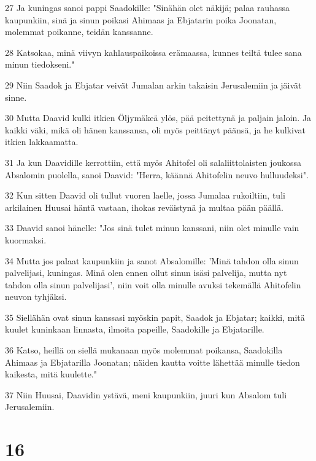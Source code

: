 \par 27 Ja kuningas sanoi pappi Saadokille: "Sinähän olet näkijä; palaa rauhassa kaupunkiin, sinä ja sinun poikasi Ahimaas ja Ebjatarin poika Joonatan, molemmat poikanne, teidän kanssanne.
\par 28 Katsokaa, minä viivyn kahlauspaikoissa erämaassa, kunnes teiltä tulee sana minun tiedokseni."
\par 29 Niin Saadok ja Ebjatar veivät Jumalan arkin takaisin Jerusalemiin ja jäivät sinne.
\par 30 Mutta Daavid kulki itkien Öljymäkeä ylös, pää peitettynä ja paljain jaloin. Ja kaikki väki, mikä oli hänen kanssansa, oli myös peittänyt päänsä, ja he kulkivat itkien lakkaamatta.
\par 31 Ja kun Daavidille kerrottiin, että myös Ahitofel oli salaliittolaisten joukossa Absalomin puolella, sanoi Daavid: "Herra, käännä Ahitofelin neuvo hulluudeksi".
\par 32 Kun sitten Daavid oli tullut vuoren laelle, jossa Jumalaa rukoiltiin, tuli arkilainen Huusai häntä vastaan, ihokas reväistynä ja multaa pään päällä.
\par 33 Daavid sanoi hänelle: "Jos sinä tulet minun kanssani, niin olet minulle vain kuormaksi.
\par 34 Mutta jos palaat kaupunkiin ja sanot Absalomille: 'Minä tahdon olla sinun palvelijasi, kuningas. Minä olen ennen ollut sinun isäsi palvelija, mutta nyt tahdon olla sinun palvelijasi', niin voit olla minulle avuksi tekemällä Ahitofelin neuvon tyhjäksi.
\par 35 Siellähän ovat sinun kanssasi myöskin papit, Saadok ja Ebjatar; kaikki, mitä kuulet kuninkaan linnasta, ilmoita papeille, Saadokille ja Ebjatarille.
\par 36 Katso, heillä on siellä mukanaan myös molemmat poikansa, Saadokilla Ahimaas ja Ebjatarilla Joonatan; näiden kautta voitte lähettää minulle tiedon kaikesta, mitä kuulette."
\par 37 Niin Huusai, Daavidin ystävä, meni kaupunkiin, juuri kun Absalom tuli Jerusalemiin.

\chapter{16}

